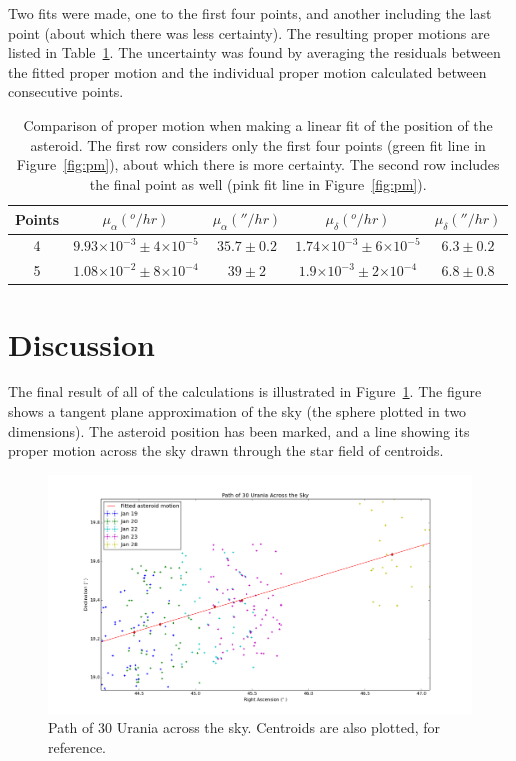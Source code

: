 \documentclass[a4paper,12pt]{article}
\providecommand{\e}[1]{\ensuremath{\times 10^{#1}}}
\begin{document}
Two fits were made, one to the first four points, and another including the last point (about which there was less certainty). The resulting proper motions are listed in Table~\ref{tab:pm}. The uncertainty was found by averaging the residuals between the fitted proper motion and the individual proper motion calculated between consecutive points.

\begin{center}
\begin{table}[!htbp]
  \centering
  \begin{tabular}{c||c||c||c||c}
  	Points & $\mu_{\alpha} (^o/hr)$ & $\mu_{\alpha} (''/hr)$ & $\mu_{\delta} (^o/hr)$ & $\mu_{\delta} (''/hr)$ \\
  	\hline
  	\hline
  	4 & $9.93\e{-3}\pm 4\e{-5}$ & $35.7\pm 0.2$ & $1.74\e{-3}\pm 6\e{-5}$& $6.3\pm 0.2$ \\
  	5 & $1.08\e{-2}\pm 8\e{-4}$ & $39\pm 2$ & $1.9\e{-3}\pm 2\e{-4}$ & $6.8\pm 0.8$ \\
   \end{tabular}
    \caption{Comparison of proper motion when making a linear fit of the position of the asteroid. The first row considers only the first four points (green fit line in Figure~\ref{fig:pm}), about which there is more certainty. The second row includes the final point as well (pink fit line in Figure~\ref{fig:pm}).}
    \label{tab:pm}
\end{table}
\end{center}




\section{Discussion}
\label{sec:discussion}

The final result of all of the calculations is illustrated in Figure~\ref{fig:path}. The figure shows a tangent plane approximation of the sky (the sphere plotted in two dimensions). The asteroid position has been marked, and a line showing its proper motion across the sky drawn through the star field of centroids.

\begin{figure}[!htbp]
\centering
\includegraphics[width = \linewidth]{path_urania.png}
\caption{Path of 30 Urania across the sky. Centroids are also plotted, for reference.}
\label{fig:path}
\end{figure}
\end{document}
